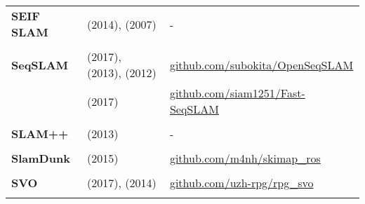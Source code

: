 \documentclass[a4paper,12pt]{scrartcl}
\begin{document}
{\begin{longtable}{l|l|l}
    \textbf{SEIF SLAM}     & \cite{Torres-Gonzalez2014} (2014), \cite{Walter2007} (2007)                                 & -                                                                     \\
                           &                                                                                             &                                                                       \\ [-3mm]
    \textbf{SeqSLAM}       & \cite{bai2017} (2017), \cite{Sunderhauf2013} (2013), \cite{Milford2012} (2012)              & {\url{github.com/subokita/OpenSeqSLAM}}                               \\
                           & \cite{Siam2017} (2017)                                                                      & {\url{github.com/siam1251/Fast-SeqSLAM}}                              \\
                           &                                                                                             &                                                                       \\ [-3mm]
    \textbf{SLAM++}        & \cite{Salas-moreno2013} (2013)                                                              & -                                                                     \\
                           &                                                                                             &                                                                       \\ [-3mm]
    \textbf{SlamDunk}      & \cite{Fioraio2015} (2015)                                                                   & {\url{github.com/m4nh/skimap_ros}}                                    \\
                           &                                                                                             &                                                                       \\ [-3mm]
    \textbf{SVO}           & \cite{Forster2017} (2017), \cite{Forster2014a} (2014)                                       & {\url{github.com/uzh-rpg/rpg_svo}}                                    \\
                           &                                                                                             &                                                                       \\ [-3mm]

\end{longtable}}
\end{document}
